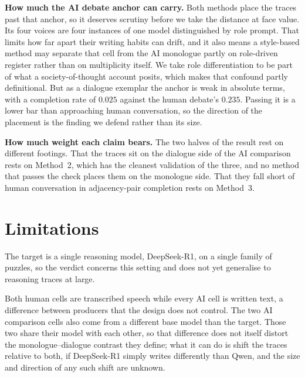 \documentclass[10pt,twocolumn]{article}
\begin{document}
\textbf{How much the AI debate anchor can carry.} Both methods place the traces past that anchor, so
it deserves scrutiny before we take the distance at face value. Its four voices are four instances
of one model distinguished by role prompt. That limits how far apart their writing habits can drift,
and it also means a style-based method may separate that cell from the AI monologue partly on
role-driven register rather than on multiplicity itself. We take role differentiation to be part of
what a society-of-thought account posits, which makes that confound partly definitional. But as a
dialogue exemplar the anchor is weak in absolute terms, with a completion rate of $0.025$
against the human debate's $0.235$. Passing it is a lower bar than approaching human conversation, so
the direction of the placement is the finding we defend rather than its size.

\textbf{How much weight each claim bears.} The two halves of the result rest on different footings.
That the traces sit on the dialogue side of the AI comparison rests on Method~2, which has the
cleanest validation of the three, and no method that passes the check places them on the monologue
side. That they fall short of human conversation in adjacency-pair completion rests on Method~3.

\section{Limitations}
The target is a single reasoning model, DeepSeek-R1, on a single family of puzzles, so the verdict
concerns this setting and does not yet generalise to reasoning traces at large.

Both human cells are transcribed speech while every AI cell is written text, a difference between
producers that the design does not control. The two AI comparison cells also come from a different
base model than the target. Those two share their model with each other, so that difference does not
itself distort the monologue--dialogue contrast they define; what it can do is shift the traces
relative to both, if DeepSeek-R1 simply writes differently than Qwen, and the size and direction of
any such shift are unknown.
\end{document}
